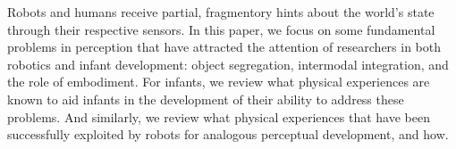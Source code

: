 
Robots and humans receive partial, fragmentory hints about the world's
state through their respective sensors.  In this paper, we focus on
some fundamental problems in perception that have attracted the
attention of researchers in both robotics and infant development:
object segregation, intermodal integration, and the role of embodiment.
For infants, we review what physical experiences are known to aid
infants in the development of their ability to address these problems.
And similarly, we review what physical experiences that have been
successfully exploited by robots for analogous perceptual development,
and how.


